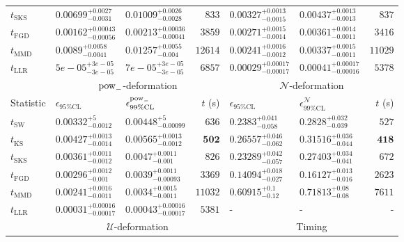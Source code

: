 \begin{tabular}{l|llr|llr}
	$t_{\mathrm{SKS}}$ & $0.00699_{-0.0031}^{+0.0027}$ & $0.01009_{-0.0028}^{+0.0026}$ & $833$ & $0.00327_{-0.0015}^{+0.0013}$ & $0.00437_{-0.0013}^{+0.0013}$ & $837$ \\
	$t_{\mathrm{FGD}}$ & ${\mathbf{0.00162_{-0.00056}^{+0.00043}}}$ & ${\mathbf{0.00213_{-0.00041}^{+0.00036}}}$ & $3859$ & $0.00271_{-0.0014}^{+0.0015}$ & $0.00361_{-0.0011}^{+0.0014}$ & $3416$ \\
	$t_{\mathrm{MMD}}$ & $0.0089_{-0.0041}^{+0.0058}$ & $0.01257_{-0.004}^{+0.0055}$ & $12614$ & ${\mathbf{0.00241_{-0.0012}^{+0.0016}}}$ & ${\mathbf{0.00337_{-0.0011}^{+0.0015}}}$ & $11029$ \\
	$t_{\mathrm{LLR}}$ & $5e-05_{-3e-05}^{+3e-05}$ & $7e-05_{-3e-05}^{+3e-05}$ & $6857$ & $0.00029_{-0.00017}^{+0.00017}$ & $0.00041_{-0.00016}^{+0.00017}$ & $5378$ \\
	\toprule
	\multicolumn{1}{c}{} & \multicolumn{3}{c}{$\rm{pow}_{-}$-deformation} & \multicolumn{3}{c}{$\mathcal{N}$-deformation} \\
	Statistic & $\epsilon_{95\%\mathrm{CL}}$ & $\epsilon^  {\rm{pow}_{-}}_{99\%\mathrm{CL}}$ & $t$ (s) & $\epsilon_{95\%\mathrm{CL}}$ & $\epsilon^    {\mathcal{N}}_{99\%\mathrm{CL}}$ & $t$ (s) \\
	\midrule
	$t_{\mathrm{SW}}$ & $0.00332_{-0.0012}^{+5}$ & $0.00448_{-0.00099}^{+5}$ & $636$ & $0.2383_{-0.058}^{+0.041}$ & $0.2828_{-0.039}^{+0.032}$ & $527$ \\
	$t_{\overline{\mathrm{KS}}}$ & $0.00427_{-0.0014}^{+0.0013}$ & $0.00565_{-0.0012}^{+0.0013}$ & ${\mathbf{502}}$ & $0.26557_{-0.062}^{+0.046}$ & $0.31516_{-0.044}^{+0.036}$ & ${\mathbf{418}}$ \\
	$t_{\mathrm{SKS}}$ & $0.00361_{-0.0012}^{+0.0011}$ & $0.0047_{-0.001}^{+0.0011}$ & $826$ & $0.23289_{-0.057}^{+0.042}$ & $0.27403_{-0.041}^{+0.034}$ & $672$ \\
	$t_{\mathrm{FGD}}$ & $0.00296_{-0.001}^{+0.0012}$ & $0.0039_{-0.00093}^{+0.0011}$ & $3369$ & ${\mathbf{0.14094_{-0.027}^{+0.018}}}$ & ${\mathbf{0.16127_{-0.016}^{+0.013}}}$ & $2623$ \\
	$t_{\mathrm{MMD}}$ & ${\mathbf{0.00241_{-0.0011}^{+0.0016}}}$ & ${\mathbf{0.0034_{-0.0011}^{+0.0015}}}$ & $11032$ & $0.60915_{-0.12}^{+0.1}$ & $0.71813_{-0.08}^{+0.08}$ & $7611$ \\
	$t_{\mathrm{LLR}}$ & $0.00031_{-0.00017}^{+0.00016}$ & $0.00043_{-0.00017}^{+0.00016}$ & $5381$ & - & - & - \\
	\toprule
	\multicolumn{1}{c}{} & \multicolumn{3}{c}{$\mathcal{U}$-deformation} & \multicolumn{3}{c}{Timing} \\

\end{tabular}

